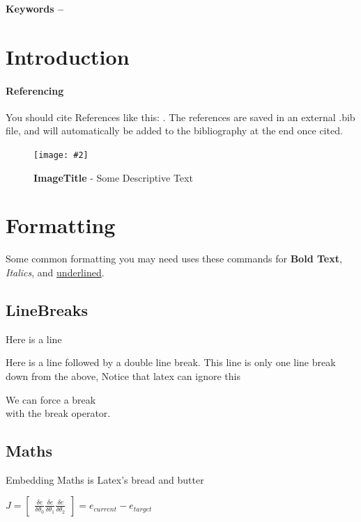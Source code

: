 \documentclass[10pt, a4paper]{article}
\title{\mytitle}
\author{\myauthor\hspace{1em}\\\contact\\Edinburgh Napier University\hspace{0.5em}-\hspace{0.5em}\mymodule}
\date{}
\newcommand{\figuremacro}[5]{
    \begin{figure}[#1]
        \centering
        \texttt{[image: \#2]}
        \caption[#3]{\textbf{#3}#4}
        \label{fig:#2}
    \end{figure}
}
\begin{document}
    \maketitle
    \begin{abstract}
        \lipsum[2]
    \end{abstract}
    
    \textbf{Keywords -- }{\mykeywords}
    
    \section{Introduction}
    \paragraph{Referencing}
    You should cite References like this: \cite{Keshav}. The references are saved in an external .bib file, and will automatically be added to the bibliography at the end once cited.
    
    \figuremacro{h}{placeholder}{ImageTitle}{ - Some Descriptive Text}{1.0}
	
	\section{Formatting}
	Some common formatting you may need uses these commands for \textbf{Bold Text}, \textit{Italics}, and \underline{underlined}.
	\subsection{LineBreaks}
	Here is a line
    
    Here is a line followed by a double line break.
	This line is only one line break down from the above, Notice that latex can ignore this
    
    We can force a break \\ with the break operator.
    
	\subsection{Maths}
    Embedding Maths is Latex's bread and butter    
    
    {\centering \Large \(
        J = \begin{bmatrix}
            \frac{\delta e}{\delta \theta _0}
            \frac{\delta e}{\delta \theta _1}
            \frac{\delta e}{\delta \theta _2}
        \end{bmatrix}
        = e_{current} - e_{target} 
    \)\par}
	
\end{document}
